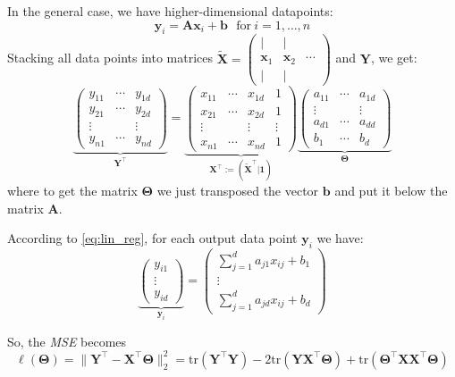 In the general case, we have higher-dimensional datapoints:
\begin{equation}
	\mathbf{y}_i = \mathbf{Ax}_i + \mathbf{b} ~~~\mathrm{for~} i=1,\dots,n
\end{equation}
Stacking all data points into matrices $\tilde{\mathbf{X}}=\left(\begin{smallmatrix}|&|&\\\mathbf{x}_1&\mathbf{x}_2&\cdots\\|&|&\end{smallmatrix}\right)$ and $\mathbf{Y}$, we get:
\begin{equation}\label{eq:lin_reg}
	\underbrace{\begin{pmatrix} y_{11} & \cdots & y_{1d}  \\ y_{21} & \cdots & y_{2d}   \\
	 \vdots & & \vdots  \\ y_{n1} & \cdots & y_{nd} \end{pmatrix}}_{\mathbf{Y}^\top} = \underbrace{\begin{pmatrix} x_{11} & \cdots & x_{1d} & 1  \\ x_{21} & \cdots & x_{2d} & 1 \\ \vdots & &\vdots & \vdots  \\ x_{n1} &  \cdots & x_{nd} & 1 \end{pmatrix}}_{\mathbf{X}^\top:=(\tilde{\mathbf{X}}^\top|\mathbf{1})}  \underbrace{\begin{pmatrix} a_{11} & \cdots & a_{1d} \\ \vdots & &\vdots \\ a_{d1} & \cdots & a_{dd} \\ b_1 & \cdots & b_d\end{pmatrix}}_{\bm{\Theta}} 
\end{equation}
where to get the matrix $\mathbf{\Theta}$ we just transposed the vector $\mathbf{b}$ and put it below the matrix $\mathbf{A}$.

According to \cref{eq:lin_reg}, for each output data point $\mathbf{y}_i$ we have:
\begin{equation}
	\underbrace{\begin{pmatrix} y_{i1} \\  \vdots \\ y_{id} \end{pmatrix}}_{\mathbf{y}_i} = \begin{pmatrix} \sum_{j=1}^d a_{j1} x_{ij}  + b_1 \\ \vdots \\  \sum_{j=1}^d a_{jd} x_{ij}  + b_d \end{pmatrix}
\end{equation}

So, the \emph{MSE} becomes
\begin{equation}
	\ell(\bm{\Theta}) = \| \mathbf{Y}^\top - \mathbf{X}^\top\bm{\Theta}\|_2^2 = \mathrm{tr}(\mathbf{Y}^\top\mathbf{Y}) -2 \mathrm{tr}(\mathbf{Y}\mathbf{X}^\top \bm{\Theta}) + \mathrm{tr}(\bm{\Theta}^\top\mathbf{X}\mathbf{X}^\top \bm{\Theta})
\end{equation}